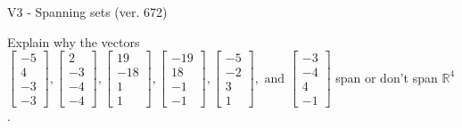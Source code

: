 \begin{exercise}
  \begin{exerciseTitle}V3 - Spanning sets (ver. 672)\end{exerciseTitle}
  \begin{exerciseStatement}
    Explain why the vectors \(\left[\begin{array}{r}
-5 \\
4 \\
-3 \\
-3
\end{array}\right] , \left[\begin{array}{r}
2 \\
-3 \\
-4 \\
-4
\end{array}\right] , \left[\begin{array}{r}
19 \\
-18 \\
1 \\
1
\end{array}\right] , \left[\begin{array}{r}
-19 \\
18 \\
-1 \\
-1
\end{array}\right] , \left[\begin{array}{r}
-5 \\
-2 \\
3 \\
1
\end{array}\right] , \text{ and } \left[\begin{array}{r}
-3 \\
-4 \\
4 \\
-1
\end{array}\right]\) span or don't span \(\mathbb{R}^4\). 
	



\end{exerciseStatement}
\end{exercise}

